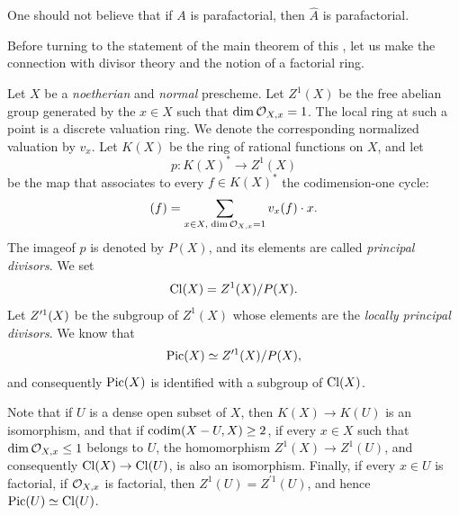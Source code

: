 One should not believe that if $A$ is parafactorial, then $\hat A$ is parafactorial.

\danger

Before turning to the statement of the main theorem of this \no, let us make the connection with divisor theory and the notion of a factorial ring.

Let $X$ be a \emph{noetherian} and \emph{normal} prescheme. Let $Z^1(X)$ be the free abelian group generated by the $x\in X$ such that $\dim\OXx=1$. The local ring at such a point is a discrete valuation ring. We denote the corresponding normalized valuation by $v_x$. Let $K(X)$ be the ring of rational functions on $X$, and let
\[
p\colon K(X)^*\to Z^1(X)
\]
be the map that associates to every $f\in K(X)^*$ the codimension-one cycle:
\[
(f) = \sum_{x\in X, \;\dim\OXx=1} v_x(f)\cdot x{\quoi}.
\]
The image\pageoriginale of $p$ is denoted by $P(X)$, and its elements are called \emph{principal divisors}. We set
\[
\Cl(X) = Z^1(X)/P(X){\quoi}.
\]
Let $\sisi{Z}{Z^{\prime1}(X)}$ be the subgroup of $Z^1(X)$ whose elements are the \emph{locally principal divisors}. We know that
\[
\Pic(X)\simeq Z^{\prime1}(X)/P(X){\quoi},
\]
and consequently $\Pic(X)$ is identified with a subgroup of $\Cl(X)$.

Note that if $U$ is a dense open subset of $X$, then $K(X)\to K(U)$ is an isomorphism, and that if $\codim(X-U, X)\geq 2$, \ie if every $x\in X$ such that $\dim\OXx\leq 1$ belongs to $U$, the homomorphism $Z^1(X)\to Z^1(U)$, and consequently $\Cl(X)\to\Cl(U)$, is also an isomorphism. Finally, if every $x\in U$ is factorial, \ie if $\OXx$ is factorial, then $Z^1(U) = Z^{\prime1}(U)$, and hence $\Pic(U)\simeq\Cl(U)$.

